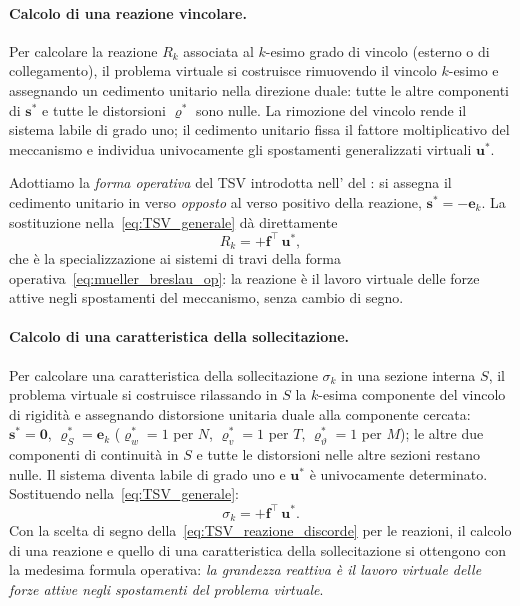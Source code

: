 \paragraph{Calcolo di una reazione vincolare.}
Per calcolare la reazione $R_k$ associata al $k$-esimo
grado di vincolo (esterno o di collegamento), il problema
virtuale si costruisce rimuovendo il vincolo $k$-esimo e
assegnando un cedimento unitario nella direzione duale:
tutte le altre componenti di $\bm{s}^*$ e tutte le
distorsioni $\bm{\varrho}^*$ sono nulle. La rimozione del
vincolo rende il sistema labile di grado uno; il cedimento
unitario fissa il fattore moltiplicativo del meccanismo e
individua univocamente gli spostamenti generalizzati
virtuali $\bm{u}^*$.

Adottiamo la \emph{forma operativa} del TSV introdotta
nell' del : si
assegna il cedimento unitario in verso \emph{opposto} al
verso positivo della reazione, $\bm{s}^* = -\bm{e}_k$.
La sostituzione nella~\eqref{eq:TSV_generale} dà
direttamente
\begin{equation}\label{eq:TSV_reazione_discorde}
	\boxed{\,R_k = +\bm{f}^\top\,\bm{u}^*,\,}
\end{equation}
che è la specializzazione ai sistemi di travi della
forma operativa~\eqref{eq:mueller_breslau_op}: la reazione
è il lavoro virtuale delle forze attive negli spostamenti
del meccanismo, senza cambio di segno.



\paragraph{Calcolo di una caratteristica della sollecitazione.}
Per calcolare una caratteristica della sollecitazione
$\sigma_k$ in una sezione interna $S$, il problema virtuale
si costruisce rilassando in $S$ la $k$-esima componente del
vincolo di rigidità e assegnando distorsione unitaria duale
alla componente cercata: $\bm{s}^* = \bm{0}$,
$\bm{\varrho}^*_S = \bm{e}_k$ ($\varrho^*_w = 1$ per $N$,
$\varrho^*_v = 1$ per $T$, $\varrho^*_\vartheta = 1$ per
$M$); le altre due componenti di continuità in $S$ e tutte
le distorsioni nelle altre sezioni restano nulle. Il
sistema diventa labile di grado uno e $\bm{u}^*$ è
univocamente determinato. Sostituendo
nella~\eqref{eq:TSV_generale}:
\begin{equation}\label{eq:TSV_CS}
	\boxed{\,\sigma_k = +\bm{f}^\top\,\bm{u}^*.\,}
\end{equation}
Con la scelta di segno della~\eqref{eq:TSV_reazione_discorde}
per le reazioni, il calcolo di una reazione e quello di una
caratteristica della sollecitazione si ottengono con la
medesima formula operativa: \emph{la grandezza reattiva è
	il lavoro virtuale delle forze attive negli spostamenti
	del problema virtuale}.



